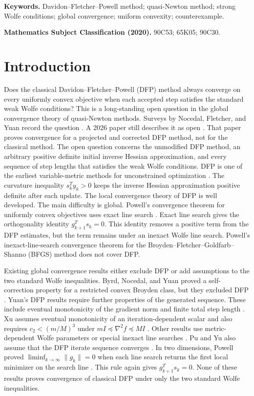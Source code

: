 \documentclass[11pt]{article}
\begin{document}
\noindent\textbf{Keywords.}
Davidon--Fletcher--Powell method; quasi-Newton method; strong Wolfe
conditions; global convergence; uniform convexity; counterexample.

\medskip
\noindent\textbf{Mathematics Subject Classification (2020).}
90C53; 65K05; 90C30.

\section{Introduction}
\label{sec:introduction}

Does the classical Davidon--Fletcher--Powell (DFP) method always converge
on every uniformly convex objective when each accepted step satisfies the
standard weak Wolfe conditions?  This is a long-standing open question in the
global convergence theory of quasi-Newton methods.  Surveys by Nocedal,
Fletcher, and Yuan record the question
\cite{Nocedal1992,Fletcher1994,Yuan1999}.  A 2026 paper still describes it as
open \cite{YuanZhouPham2026}.  That paper proves convergence for a projected
and corrected DFP method, not for the classical method.  The open question
concerns the unmodified DFP method, an arbitrary positive definite initial
inverse Hessian approximation, and every sequence of step lengths that
satisfies the weak Wolfe conditions.  DFP is one of the earliest
variable-metric methods for unconstrained optimization
\cite{Davidon1991,FletcherPowell1963}.  The curvature inequality $s_k^Ty_k>0$
keeps the inverse Hessian approximation positive definite after each update.
The local convergence theory of DFP is well developed.  The main difficulty
is global.  Powell's convergence theorem for uniformly convex objectives uses
exact line search \cite{Powell1971}.  Exact line search gives the orthogonality
identity $g_{k+1}^Ts_k=0$.  This identity removes a positive term from the DFP
estimates, but the term remains under an inexact Wolfe line search.  Powell's
inexact-line-search convergence theorem for the
Broyden--Fletcher--Goldfarb--Shanno (BFGS) method \cite{Powell1976} does not
cover DFP.

Existing global convergence results either exclude DFP or add assumptions to
the two standard Wolfe inequalities.  Byrd, Nocedal, and Yuan proved a
self-correction property for a restricted convex Broyden class, but they
excluded DFP \cite{ByrdNocedalYuan1987}.  Yuan's DFP results require further
properties of the generated sequence.  These include eventual monotonicity of
the gradient norm and finite total step length \cite{Yuan1995}.  Xu assumes
eventual monotonicity of an iteration-dependent scalar and also requires
$c_2<(m/M)^3$ under $mI\preceq\nabla^2f\preceq MI$ \cite{Xu1997}.  Other
results use metric-dependent Wolfe parameters or special inexact line searches
\cite{Pu2002,LiuJingHan2002}.  Pu and Yu also assume that the DFP iterate
sequence converges \cite{PuYu1990}.  In two dimensions, Powell proved
$\liminf_{k\to\infty}\|g_k\|=0$ when each line search returns the first local
minimizer on the search line \cite{Powell2000}.  This rule again gives
$g_{k+1}^Ts_k=0$.  None of these results proves convergence of classical DFP
under only the two standard Wolfe inequalities.
\end{document}
